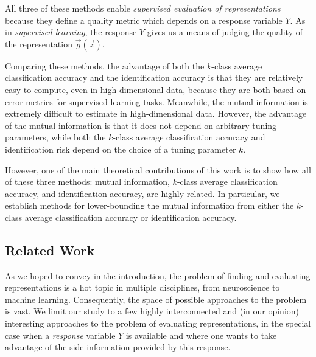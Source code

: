 All three of these methods enable \emph{supervised evaluation of
  representations} because they define a quality metric which depends
on a response variable $Y$.  As in \emph{supervised learning}, the
response $Y$ gives us a means of judging the quality of the
representation $\vec{g}(\vec{z})$.

Comparing these methods, the advantage of both the $k$-class average
classification accuracy and the identification accuracy is that they
are relatively easy to compute, even in high-dimensional data, because
they are both based on error metrics for supervised learning tasks.
Meanwhile, the mutual information is extremely difficult to estimate
in high-dimensional data.  However, the advantage of the mutual
information is that it does not depend on arbitrary tuning parameters,
while both the $k$-class average classification accuracy and
identification risk depend on the choice of a tuning parameter $k$.

However, one of the main theoretical contributions of this work is to
show how all of these three methods: mutual information, $k$-class
average classification accuracy, and identification accuracy, are
highly related.  In particular, we establish methods for
lower-bounding the mutual information from either the $k$-class
average classification accuracy or identification accuracy.

\subsection{Related Work}

As we hoped to convey in the introduction, the problem of finding and
evaluating representations is a hot topic in multiple disciplines,
from neuroscience to machine learning.  Consequently, the space of
possible approaches to the problem is vast.  We limit our study to a
few highly interconnected and (in our opinion) interesting approaches
to the problem of evaluating representations, in the special case when
a \emph{response} variable $Y$ is available and where one wants to
take advantage of the side-information provided by this response.

